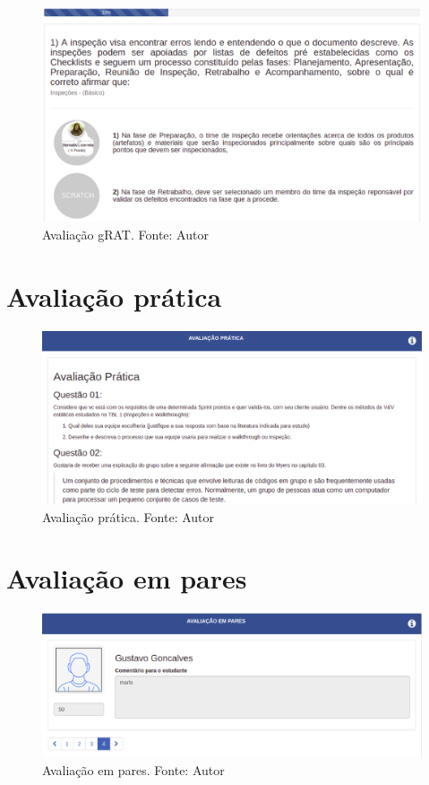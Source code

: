 \begin{apendicesenv}
\begin{figure}[h!]
	\centering
  \includegraphics[keepaspectratio=true,scale=0.42]{figuras/grat.eps}
  \caption[Avaliação gRAT]{Avaliação gRAT. Fonte: Autor}
	\label{fig:grat}
\end{figure}

\section{Avaliação prática}

\begin{figure}[H]
	\centering
  \includegraphics[keepaspectratio=true,scale=0.42]{figuras/pratica.eps}
  \caption[Avaliação prática]{Avaliação prática. Fonte: Autor}
	\label{fig:pratica}
\end{figure}

\section{Avaliação em pares}

\begin{figure}[h!]
	\centering
  \includegraphics[keepaspectratio=true,scale=0.42]{figuras/pares.eps}
  \caption[Avaliação em pares]{Avaliação em pares. Fonte: Autor}
	\label{fig:pares}
\end{figure}


\end{apendicesenv}
